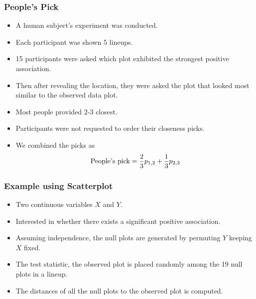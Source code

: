 \documentclass{beamer}
\begin{document}
\begin{frame}
\frametitle{People's Pick}
\begin{itemize}
\item A human subject's experiment was conducted.
\item Each participant was shown 5 lineups.
\item 15 participants were asked which plot exhibited the strongest positive association.
\item Then after revealing the location, they were asked the plot that looked most similar to the observed data plot.
\item Most people provided 2-3 closest.
\item Participants were not requested to order their closeness picks. 
\item We combined the picks as 
\[
\hbox{People's pick} = \frac{2}{3} p_{1,2} + \frac{1}{3} p_{2,3}
\]
\end{itemize}
\end{frame}


\begin{frame}
\frametitle{Example using Scatterplot}
\begin{itemize}
\item Two continuous variables $X$ and $Y$.
\item Interested in whether there exists a significant positive association.
\item Assuming independence, the null plots are generated by permuting $Y$ keeping $X$ fixed.
\item The test statistic, the observed plot is placed randomly among the 19 null plots in a lineup.
\item The distances of all the null plots to the observed plot is computed.
\end{itemize}

\end{frame}
\end{document}
